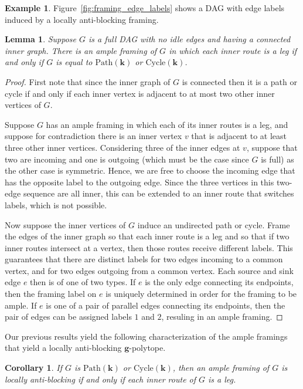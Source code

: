 \documentclass[12pt]{amsart}
\newtheorem{lemma}[theorem]{Lemma}
\newtheorem{corollary}[theorem]{Corollary}
\theoremstyle{definition}
\newtheorem{example}[theorem]{Example}
\newcommand\bg{\mathbf{g}}
\newcommand\bk{\mathbf{k}}
\newcommand\Path{\mathrm{Path}}
\newcommand\Cycle{\mathrm{Cycle}}
\begin{document}
\begin{example}
Figure~\ref{fig:framing_edge_labels} shows a DAG with edge labels induced by a locally anti-blocking framing.
\end{example}


\begin{lemma}\label{lem:<3switch-iff-indeg<3}
Suppose $G$ is a full DAG with no idle edges and having a connected inner graph.
There is an ample framing of $G$ in which each inner route is a leg if and only if $G$ is equal to $\Path(\bk)$ or $\Cycle(\bk)$.
\end{lemma}

\begin{proof}
First note that since the inner graph of $G$ is connected then it is a path or cycle if and only if each inner vertex is adjacent to at most two other inner vertices of $G$.

Suppose $G$ has an ample framing in which each of its inner routes is a leg, and suppose for contradiction there is an inner vertex $v$ that is adjacent to at least three other inner vertices.
Considering three of the inner edges at $v$, suppose that two are incoming and one is outgoing (which must be the case since $G$ is full) as the other case is symmetric.
Hence, we are free to choose the incoming edge that has the opposite label to the outgoing edge.
Since the three vertices in this two-edge sequence are all inner, this can be extended to an inner route that switches labels, which is not possible.

Now suppose the inner vertices of $G$ induce an undirected path or cycle.
Frame the edges of the inner graph so that each inner route is a leg and so that if two inner routes intersect at a vertex, then those routes receive different labels.
This guarantees that there are distinct labels for two edges incoming to a common vertex, and for two edges outgoing from a common vertex.
Each source and sink edge $e$ then is of one of two types.
If $e$ is the only edge connecting its endpoints, then the framing label on $e$ is uniquely determined in order for the framing to be ample.
If $e$ is one of a pair of parallel edges connecting its endpoints, then the pair of edges can be assigned labels $1$ and $2$, resuling in an ample framing.
\end{proof}

Our previous results yield the following characterization of the ample framings that yield a locally anti-blocking $\bg$-polytope.

\begin{corollary}\label{cor.2framings}
If $G$ is $\Path(\bk)$ or $\Cycle(\bk)$, then an ample framing of $G$ is locally anti-blocking if and only if each inner route of $G$ is a leg.
\end{corollary}
\end{document}
